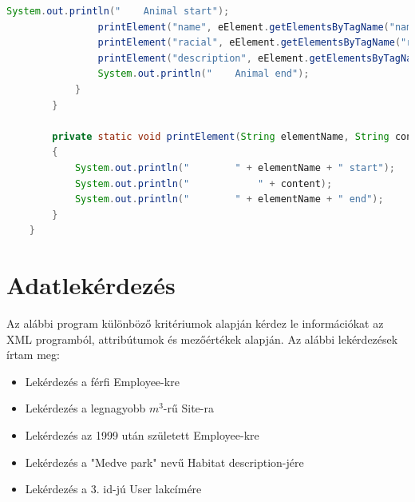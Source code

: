 \documentclass[12pt]{report}
\begin{document}
\begin{lstlisting}[caption={DOMQModifyKLNSPG.java} olvasó program, language=Java]
				System.out.println("    Animal start");
				printElement("name", eElement.getElementsByTagName("name").item(0).getTextContent());
				printElement("racial", eElement.getElementsByTagName("racial").item(0).getTextContent());
				printElement("description", eElement.getElementsByTagName("description").item(0).getTextContent());
				System.out.println("    Animal end");
			}
		}
		
		private static void printElement(String elementName, String content)
		{
			System.out.println("        " + elementName + " start");
			System.out.println("            " + content);
			System.out.println("        " + elementName + " end");
		}
	}
\end{lstlisting}

\section{Adatlekérdezés}
\indent\indent Az alábbi program különböző kritériumok alapján kérdez le információkat az XML programból, attribútumok és mezőértékek alapján. Az alábbi lekérdezések írtam meg:
\begin{itemize}
	\item Lekérdezés a férfi Employee-kre
	\item Lekérdezés a legnagyobb $m^3$-rű Site-ra
	\item Lekérdezés az 1999 után született Employee-kre
	\item Lekérdezés a "Medve park" nevű Habitat description-jére
	\item Lekérdezés a 3. id-jú User lakcímére
\end{itemize}
\end{document}
